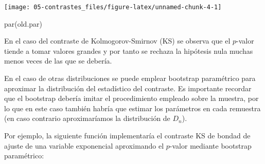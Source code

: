 \documentclass[
]{book}
\newenvironment{Shaded}{\begin{snugshade}}{\end{snugshade}}
\newcommand{\FunctionTok}[1]{\textcolor[rgb]{0.00,0.00,0.00}{#1}}
\newcommand{\NormalTok}[1]{#1}
\theoremstyle{break}
\theoremstyle{definition}
\theoremstyle{definition}
\theoremstyle{definition}
\theoremstyle{definition}
\theoremstyle{remark}
\begin{document}
\begin{center}\texttt{[image: 05-contrastes\_files/figure-latex/unnamed-chunk-4-1]} \end{center}

\begin{Shaded}
\begin{Highlighting}[]
\FunctionTok{par}\NormalTok{(old.par)}
\end{Highlighting}
\end{Shaded}

En el caso del contraste de Kolmogorov-Smirnov (KS) se observa que el \(p\)-valor
tiende a tomar valores grandes y por tanto se rechaza la hipótesis nula
muchas menos veces de las que se debería.

En el caso de otras distribuciones se puede emplear bootstrap paramétrico para
aproximar la distribución del estadístico del contraste.
Es importante recordar que el bootstrap debería imitar el procedimiento
empleado sobre la muestra, por lo que en este caso también habría que estimar
los parámetros en cada remuestra
(en caso contrario aproximaríamos la distribución de \(D_n\)).

Por ejemplo, la siguiente función implementaría el contraste KS de
bondad de ajuste de una variable exponencial aproximando el
\(p\)-valor mediante bootstrap paramétrico:
\end{document}
